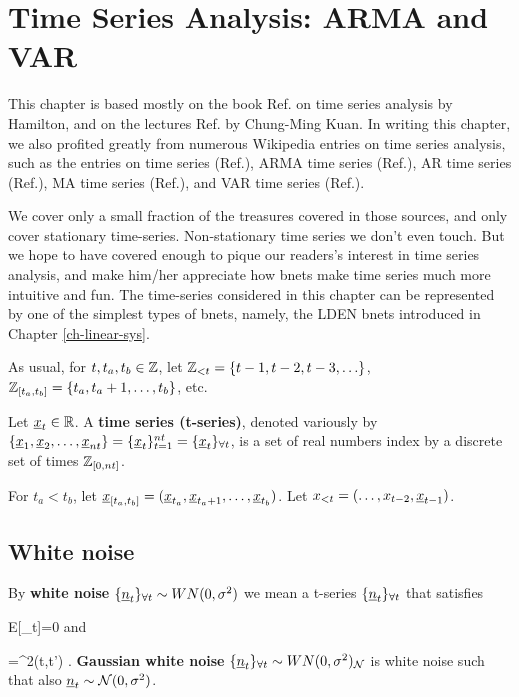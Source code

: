 \chapter{Time Series Analysis:
ARMA and VAR}\label{ch-time-arma}



This chapter is based mostly
on the book  Ref.\cite{hamilton2020time}
on time series analysis by Hamilton,
and on the lectures Ref. \cite{t-series-kuan}
by Chung-Ming Kuan.
In writing this chapter, we also profited greatly
from numerous Wikipedia entries on time series
analysis,
such as  the entries
on
time series (Ref.\cite{wiki-time-series}),
ARMA time series (Ref.\cite{wiki-ARMA}),
AR time series (Ref.\cite{wiki-AR}),
MA time series (Ref.\cite{wiki-MA}), and
VAR time series (Ref.\cite{wiki-VAR}).



We cover only a small fraction
 of the  treasures
covered in those sources,
and only
cover stationary
time-series. Non-stationary
time series
we don't even touch.
But we hope to have covered
enough to pique
our readers's interest in time series analysis,
and make him/her appreciate
how bnets make
 time series much more
intuitive and fun.
The time-series
considered in this chapter
can
be represented
by one of the
simplest
types of
bnets, namely, the LDEN bnets
introduced in
Chapter \ref{ch-linear-sys}.



As usual, for $t, t_a, t_b\in {\mathbb{Z}}$,
 let
 ${\mathbb{Z}}_{<t}=
\{t-1, t-2, t-3, \ldots\}$,
${\mathbb{Z}}_{[t_a, t_b]}=\{t_a, t_a+1,
\ldots, t_b\}$, etc.

Let ${\underline{x}}_t\in { \mathbb{R}}$.
A
{\bf time series (t-series)},
denoted variously by
$\{{\underline{x}}_1, {\underline{x}}_2, \ldots,
{\underline{x}}_{nt}\}
=\{{\underline{x}}_t\}_{t=1}^{nt}
={\{{\underline{x}}_t\}_{\forall t}}$,
is a set of real numbers
index by a discrete set of times
${\mathbb{Z}}_{[0, nt]}$.


For $t_a<t_b$, let
${\underline{x}}_{[t_a, t_b]}=({\underline{x}}_{t_a},
{\underline{x}}_{t_a+1},
 \ldots, {\underline{x}}_{t_b})$.
Let $x_{<t}=(\ldots, x_{t-2}, {\underline{x}}_{t-1})$.

\section{White noise}

By {\bf white noise}
${\{{\underline{n}}_t\}_{\forall t}}\sim  WN(0, \sigma^2)$
we mean a t-series ${\{{\underline{n}}_t\}_{\forall t}}$
that satisfies

\beq
E[\rvn_t]=0
\eeq
and

\beq
{}=\s^2\delta(t,t')
\;.
\eeq
{\bf Gaussian white noise}
${\{{\underline{n}}_t\}_{\forall t}}\sim WN(0, \sigma^2)_{\cal N}$
is white noise such that also
${\underline{n}}_t\sim {\cal N}(0, \sigma^2)$.

